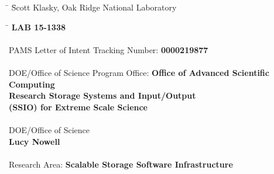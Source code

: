 
\begin{tabbing}
\hspace*{10mm} \=  \= Scott Klasky, Oak Ridge National Laboratory \\
\end{tabbing}


\begin{tabbing}
\hspace*{10mm} \=  \= \textbf{LAB 15-1338}\\
\\
\> {PAMS Letter of Intent Tracking Number:}			    \> \textbf{0000219877}\\
\\
\> {DOE/Office of Science Program Office:} \> \textbf{Office of Advanced Scientific Computing}\\
\>									    \> \textbf{Research Storage Systems and Input/Output}\\
\>									    \> \textbf{(SSIO) for Extreme Scale Science}\\
\\
\> {DOE/Office of Science}  \> \\
\>  \>  \textbf{Lucy Nowell}\\
\\
\> {Research Area:} \>\textbf{Scalable Storage Software Infrastructure}

\end{tabbing}




\newpage